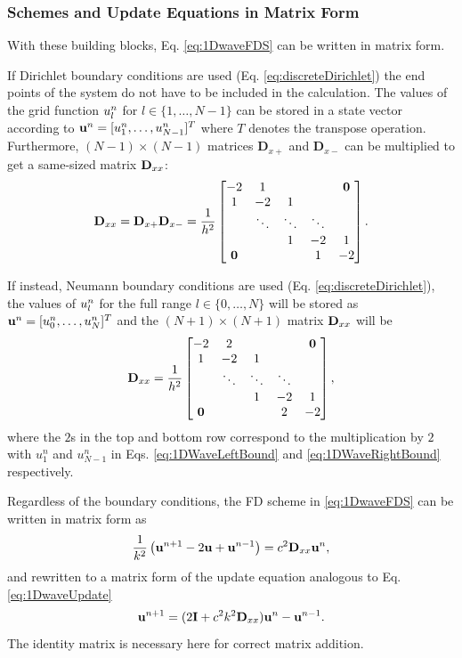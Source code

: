 \subsubsection{Schemes and Update Equations in Matrix Form}
With these building blocks, Eq. \eqref{eq:1DwaveFDS} can be written in matrix form.

If Dirichlet boundary conditions are used (Eq. \eqref{eq:discreteDirichlet}) the end points of the system do not have to be included in the calculation. The values of the grid function $u_l^n$ for $l\in \{1, \hdots, N-1\}$ can be stored in a state vector according to $\mathbf{u}^n = [u_1^n, \hdots, u_{N-1}^n]^T$ where $T$ denotes the transpose operation. Furthermore, $(N-1) \times (N-1)$ matrices $\mathbf{D}_{x+}$ and $\mathbf{D}_{x-}$ can be multiplied to get a same-sized matrix $\mathbf{D}_{xx}$:
\begin{equation}
    \mathbf{D}_{xx} = \mathbf{D}_{x+}\mathbf{D}_{x-} = \frac{1}{h^2}\begin{bmatrix}
        -2 & 1 & & &\mathbf{0}\\
        1 & -2 & 1 & & \\
        & \ddots & \ddots & \ddots & \\
        & & 1 & -2 & 1 \\
        \mathbf{0}& & & 1 & -2 
    \end{bmatrix}.
\end{equation}

If instead, Neumann boundary conditions are used (Eq. \eqref{eq:discreteDirichlet}), the values of $u_l^n$ for the full range $l\in \{0, \hdots, N\}$ will be stored as $\mathbf{u}^n=[u_0^n, \hdots, u_N^n]^T$ and the $(N+1) \times (N+1)$ matrix $\mathbf{D}_{xx}$ will be 
\begin{equation}
    \mathbf{D}_{xx} = \frac{1}{h^2}\begin{bmatrix}
        -2 & 2 & & &\mathbf{0}\\
        1 & -2 & 1 & & \\
        & \ddots & \ddots & \ddots & \\
        & & 1 & -2 & 1 \\
        \mathbf{0}& & & 2 & -2 
    \end{bmatrix},
\end{equation}
where the $2$s in the top and bottom row correspond to the multiplication by $2$ with $u_1^n$ and $u_{N-1}^n$ in Eqs. \eqref{eq:1DWaveLeftBound} and \eqref{eq:1DWaveRightBound} respectively.

Regardless of the boundary conditions, the FD scheme in \eqref{eq:1DwaveFDS} can be written in matrix form as
\begin{equation}\label{eq:1DwaveMatrix}
    \frac{1}{k^2}\left(\mathbf{u}^{n+1} - 2 \mathbf{u} + \mathbf{u}^{n-1}\right) = c^2 \mathbf{D}_{xx} \mathbf{u}^n,
\end{equation}
and rewritten to a matrix form of the update equation analogous to Eq. \eqref{eq:1DwaveUpdate}
\begin{equation}
    \mathbf{u}^{n+1} = (2\mathbf{I} + c^2k^2 \mathbf{D}_{xx} )\mathbf{u}^n - \mathbf{u}^{n-1}.
\end{equation}
The identity matrix is necessary here for correct matrix addition.

